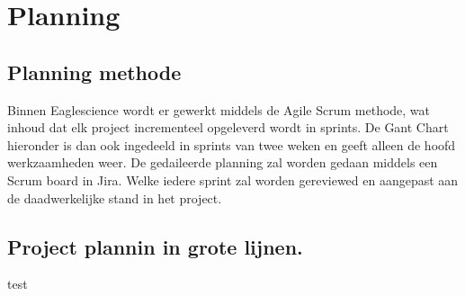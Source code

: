 
\chapter{Planning}\label{ch:planning} %

\label{planning} %

\section{Planning methode}\label{sec:planning-methode}
Binnen Eaglescience wordt er gewerkt middels de Agile Scrum methode, wat inhoud dat elk project incrementeel opgeleverd wordt in sprints.
De Gant Chart hieronder is dan ook ingedeeld in sprints van twee weken en geeft alleen de hoofd werkzaamheden weer.
De gedaileerde planning zal worden gedaan middels een Scrum board in Jira.
Welke iedere sprint zal worden gereviewed en aangepast aan de daadwerkelijke stand in het project.

\section{Project plannin in grote lijnen.}\label{sec:project-plannin-in-grote-lijnen.}


test

